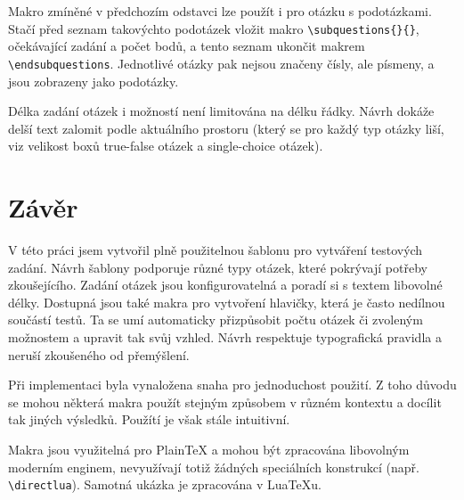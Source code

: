 \documentclass{article}
\begin{document}
    Makro zmíněné v předchozím odstavci lze použít i pro otázku s podotázkami. Stačí před seznam takovýchto podotázek
    vložit makro \texttt{\textbackslash subquestions\{\}\{\}}, očekávající zadání a počet bodů, a tento
    seznam ukončit makrem \texttt{\textbackslash endsubquestions}. Jednotlivé otázky pak nejsou značeny čísly, ale písmeny, a
    jsou zobrazeny jako podotázky.

    Délka zadání otázek i možností není limitována na délku řádky. Návrh dokáže delší text zalomit podle
    aktuálního prostoru (který se pro každý typ otázky liší, viz velikost boxů true-false otázek a single-choice otázek). 

\section{Závěr}
    V této práci jsem vytvořil plně použitelnou šablonu pro vytváření testových zadání. Návrh šablony podporuje
    různé typy otázek, které pokrývají potřeby zkoušejícího. Zadání otázek jsou konfigurovatelná a poradí si s textem libovolné
    délky. Dostupná jsou také makra pro vytvoření hlavičky, která je často nedílnou součástí testů. Ta se umí automaticky
    přizpůsobit počtu otázek či zvoleným možnostem a upravit tak svůj vzhled. Návrh respektuje typografická pravidla
    a neruší zkoušeného od přemýšlení.

    Při implementaci byla vynaložena snaha pro jednoduchost použití. Z toho důvodu se mohou některá makra použít stejným způsobem
    v různém kontextu a docílit tak jiných výsledků. Použítí je však stále intuitivní.

    Makra jsou využitelná pro Plain\TeX{} a mohou být zpracována libovolným moderním enginem, nevyužívají
    totiž žádných speciálních konstrukcí (např. \texttt{\textbackslash directlua}). Samotná ukázka je zpracována v Lua\TeX{}u.  
\end{document}
